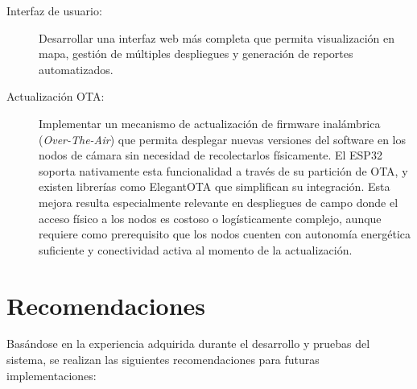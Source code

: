 \documentclass[a4paper, 12pt]{report}
\begin{document}
\begin{description}
  \item[Interfaz de usuario:] Desarrollar una interfaz web más completa
    que permita visualización en mapa, gestión de múltiples despliegues
    y generación de reportes automatizados.

  \item[Actualización OTA:] Implementar un mecanismo de
    actualización de firmware inalámbrica (\textit{Over-The-Air}) que
    permita desplegar nuevas versiones del software en los nodos de
    cámara sin necesidad de recolectarlos físicamente. El ESP32 soporta
    nativamente esta funcionalidad a través de su partición de OTA,
    y existen librerías como ElegantOTA que simplifican su integración.
    Esta mejora resulta especialmente relevante en despliegues de campo
    donde el acceso físico a los nodos es costoso o logísticamente
    complejo, aunque requiere como prerequisito que los nodos cuenten
    con autonomía energética suficiente y conectividad activa al momento
    de la actualización.
\end{description}

\section{Recomendaciones}

Basándose en la experiencia adquirida durante el desarrollo y pruebas
del sistema, se realizan las siguientes recomendaciones para futuras
implementaciones:
\end{document}
